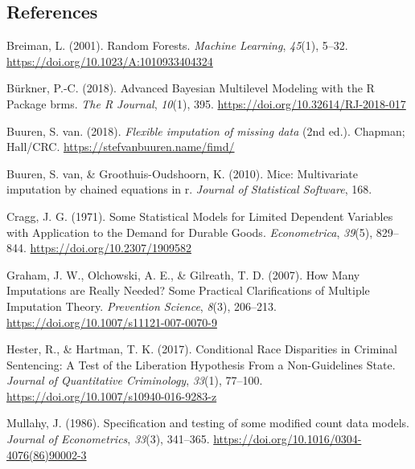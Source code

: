 \documentclass[
  letterpaper,
  DIV=11,
  numbers=noendperiod]{scrartcl}
\newlength{\cslhangindent}
\newlength{\cslentryspacingunit} %
\newenvironment{CSLReferences}[2] %
 {%
  \setlength{\parindent}{0pt}
  \ifodd #1
  \let\oldpar\par
  \def\par{\hangindent=\cslhangindent\oldpar}
  \fi
  \setlength{\parskip}{#2\cslentryspacingunit}
 }%
 {}
\begin{document}
\newpage

\hypertarget{references}{%
\subsection*{References}\label{references}}

\hypertarget{refs}{}
\begin{CSLReferences}{1}{0}
\leavevmode{}%
Breiman, L. (2001). Random Forests. \emph{Machine Learning},
\emph{45}(1), 5--32. \url{https://doi.org/10.1023/A:1010933404324}

\leavevmode{}%
Bürkner, P.-C. (2018). Advanced Bayesian Multilevel Modeling with the R
Package brms. \emph{The R Journal}, \emph{10}(1), 395.
\url{https://doi.org/10.32614/RJ-2018-017}

\leavevmode{}%
Buuren, S. van. (2018). \emph{Flexible imputation of missing data} (2nd
ed.). Chapman; Hall/CRC. \url{https://stefvanbuuren.name/fimd/}

\leavevmode{}%
Buuren, S. van, \& Groothuis-Oudshoorn, K. (2010). Mice: Multivariate
imputation by chained equations in r. \emph{Journal of Statistical
Software}, 168.

\leavevmode{}%
Cragg, J. G. (1971). Some {Statistical Models} for {Limited Dependent
Variables} with {Application} to the {Demand} for {Durable Goods}.
\emph{Econometrica}, \emph{39}(5), 829--844.
\url{https://doi.org/10.2307/1909582}

\leavevmode{}%
Graham, J. W., Olchowski, A. E., \& Gilreath, T. D. (2007). How {Many
Imputations} are {Really Needed}? {Some Practical Clarifications} of
{Multiple Imputation Theory}. \emph{Prevention Science}, \emph{8}(3),
206--213. \url{https://doi.org/10.1007/s11121-007-0070-9}

\leavevmode{}%
Hester, R., \& Hartman, T. K. (2017). Conditional {Race Disparities} in
{Criminal Sentencing}: {A Test} of the {Liberation Hypothesis From} a
{Non-Guidelines State}. \emph{Journal of Quantitative Criminology},
\emph{33}(1), 77--100. \url{https://doi.org/10.1007/s10940-016-9283-z}

\leavevmode{}%
Mullahy, J. (1986). Specification and testing of some modified count
data models. \emph{Journal of Econometrics}, \emph{33}(3), 341--365.
\url{https://doi.org/10.1016/0304-4076(86)90002-3}


\end{CSLReferences}
\end{document}
